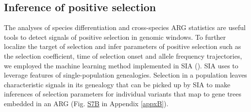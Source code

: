 \subsection{Inference of positive selection}
The analyses of species differentiation and cross-species \ac{ARG} statistics are useful tools to detect signals of positive selection in genomic windows. To further localize the target of selection and infer parameters of positive selection such as the selection coefficient, time of selection onset and allele frequency trajectories, we employed the machine learning method implemented in \ac{SIA} (\cite{hejase_deep-learning_2022}). \ac{SIA} uses  to leverage features of single-population genealogies. Selection in a population leaves characteristic signals in its genealogy that can be picked up by \ac{SIA} to make inferences of selection parameters for individual variants that map to gene trees embedded in an \ac{ARG} (Fig. \href{https://journals.plos.org/PLOSGENETICS/article?id=10.1371/journal.pgen.1010474#sec017}{S7B} in Appendix \ref{appxB}).

